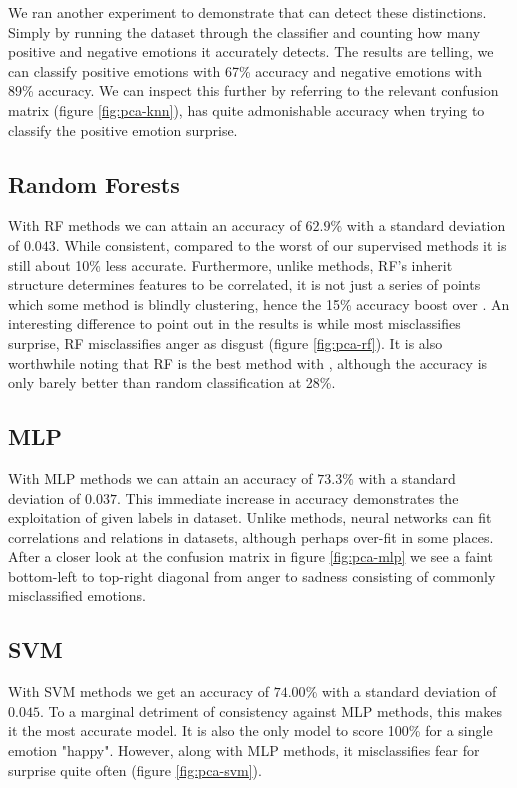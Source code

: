 We ran another experiment to demonstrate that \knn can detect these distinctions. Simply by running the dataset through the \knn classifier and counting how many positive and negative emotions it accurately detects. The results are telling, we can classify positive emotions with 67\% accuracy and negative emotions with 89\% accuracy. We can inspect this further by referring to the relevant confusion matrix (figure \ref{fig:pca-knn}), \knn has quite admonishable accuracy when trying to classify the positive emotion surprise.

\subsection{Random Forests}

With RF methods we can attain an accuracy of $62.9\%$ with a standard deviation of $0.043$. While consistent, compared to the worst of our supervised methods it is still about 10\% less accurate. Furthermore, unlike \knn methods, RF's inherit structure determines features to be correlated, it is not just a series of points which some method is blindly clustering, hence the 15\% accuracy boost over \knn. An interesting difference to point out in the results is while \knn most misclassifies surprise, RF misclassifies anger as disgust (figure \ref{fig:pca-rf}). It is also worthwhile noting that RF is the best method with \tsne, although the accuracy is only barely better than random classification at 28\%.

\subsection{MLP}

With MLP methods we can attain an accuracy of $73.3\%$ with a standard deviation of $0.037$. This immediate increase in accuracy demonstrates the exploitation of given labels in dataset. Unlike \knn methods, neural networks can fit correlations and relations in datasets, although perhaps over-fit in some places. After a closer look at the confusion matrix in figure \ref{fig:pca-mlp} we see a faint bottom-left to top-right diagonal from anger to sadness consisting of commonly misclassified emotions.

\subsection{SVM}

With SVM methods we get an accuracy of $74.00\%$ with a standard deviation of $0.045$. To a marginal detriment of consistency against MLP methods, this makes it the most accurate model. It is also the only model to score 100\% for a single emotion "happy". However, along with MLP methods, it misclassifies fear for surprise quite often (figure \ref{fig:pca-svm}).

